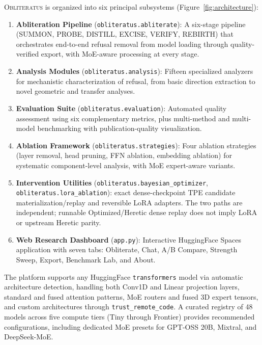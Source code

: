 \documentclass[11pt]{article}
\begin{document}
\textsc{Obliteratus} is organized into six principal subsystems (Figure~\ref{fig:architecture}):

\begin{enumerate}[leftmargin=*]
    \item \textbf{Abliteration Pipeline} (\texttt{obliteratus.abliterate}): A six-stage pipeline (SUMMON, PROBE, DISTILL, EXCISE, VERIFY, REBIRTH) that orchestrates end-to-end refusal removal from model loading through quality-verified export, with MoE-aware processing at every stage.
    \item \textbf{Analysis Modules} (\texttt{obliteratus.analysis}): Fifteen specialized analyzers for mechanistic characterization of refusal, from basic direction extraction to novel geometric and transfer analyses.
    \item \textbf{Evaluation Suite} (\texttt{obliteratus.evaluation}): Automated quality assessment using six complementary metrics, plus multi-method and multi-model benchmarking with publication-quality visualization.
    \item \textbf{Ablation Framework} (\texttt{obliteratus.strategies}): Four ablation strategies (layer removal, head pruning, FFN ablation, embedding ablation) for systematic component-level analysis, with MoE expert-aware variants.
    \item \textbf{Intervention Utilities} (\texttt{obliteratus.bayesian\_optimizer}, \texttt{obliteratus.lora\_ablation}): exact dense-checkpoint TPE candidate materialization/replay and reversible LoRA adapters. The two paths are independent; runnable Optimized/Heretic dense replay does not imply LoRA or upstream Heretic parity.
    \item \textbf{Web Research Dashboard} (\texttt{app.py}): Interactive HuggingFace Spaces application with seven tabs: Obliterate, Chat, A/B Compare, Strength Sweep, Export, Benchmark Lab, and About.
\end{enumerate}

The platform supports any HuggingFace \texttt{transformers} model via automatic architecture detection, handling both Conv1D and Linear projection layers, standard and fused attention patterns, MoE routers and fused 3D expert tensors, and custom architectures through \texttt{trust\_remote\_code}. A curated registry of 48 models across five compute tiers (Tiny through Frontier) provides recommended configurations, including dedicated MoE presets for GPT-OSS 20B, Mixtral, and DeepSeek-MoE.
\end{document}
